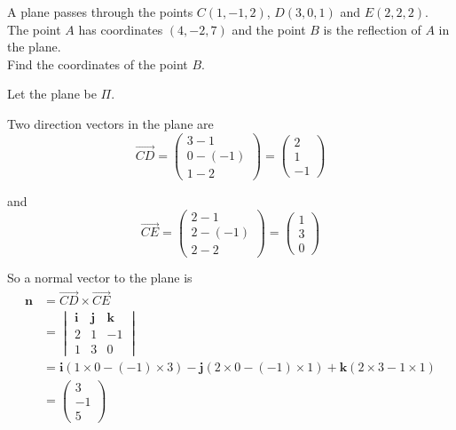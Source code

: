 \documentclass[leqno]{article}
\begin{document}
\djsFrontMatter
\begin{enumerate}[
  label=\textbf{\arabic*.},
  leftmargin=*,
  topsep=0pt,
  partopsep=0pt,
  parsep=0pt
]

\questionitem

A plane passes through the points $C(1,-1,2)$, $D(3,0,1)$ and $E(2,2,2)$. \\

The point $A$ has coordinates $(4,-2,7)$ and the point $B$ is the reflection of $A$ in the plane. \\

Find the coordinates of the point $B$. 

\vspace*{10pt}

\begin{djsSolution}
Let the plane be \(\Pi\).

Two direction vectors in the plane are
\[
\overrightarrow{CD}=\begin{pmatrix}3-1\\0-(-1)\\1-2\end{pmatrix}=\begin{pmatrix}2\\1\\-1\end{pmatrix}
\]

and
\[
\overrightarrow{CE}=\begin{pmatrix}2-1\\2-(-1)\\2-2\end{pmatrix}=\begin{pmatrix}1\\3\\0\end{pmatrix}
\]

So a normal vector to the plane is
\begin{align*}
\mathbf n
&=\overrightarrow{CD}\times\overrightarrow{CE}\\
&=
\begin{vmatrix}
\mathbf i & \mathbf j & \mathbf k\\
2 & 1 & -1\\
1 & 3 & 0
\end{vmatrix}\\
&=\mathbf i(1\times 0-(-1)\times 3)-\mathbf j(2\times 0-(-1)\times 1)+\mathbf k(2\times 3-1\times 1)\\
&=\begin{pmatrix}3\\-1\\5\end{pmatrix}
\end{align*}


\end{djsSolution}
\end{enumerate}
\end{document}

